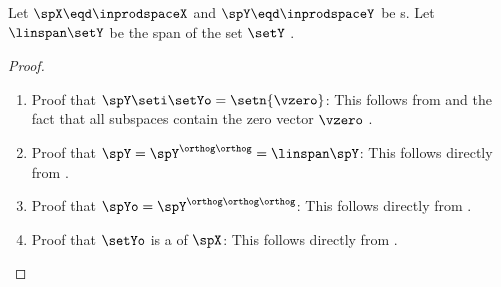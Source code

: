 \begin{corollary}
\label{cor:inprod_orthog}
Let  $\spX\eqd\inprodspaceX$ and $\spY\eqd\inprodspaceY$ be s.
Let $\linspan\setY$ be the span of the set $\setY$ .
\end{corollary}
\begin{proof}
\begin{enumerate}
  \item Proof that $\spY\seti \setYo      = \setn{\vzero}               $: This follows from  and the fact that all subspaces contain the zero vector $\vzero$ .
  \item Proof that $\spY                  = \spY^{\orthog\orthog} = \linspan\spY$: This follows directly from .
  \item Proof that $\spYo                 = \spY^{\orthog\orthog\orthog}$: This follows directly from .
  \item Proof that $\setYo$ is a  of $\spX$: This follows directly from .
\end{enumerate}
\end{proof}




